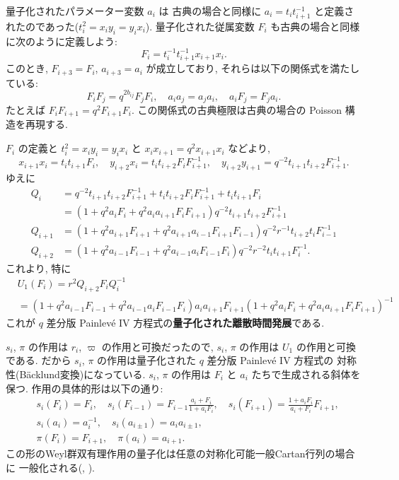 \documentclass[12pt,twoside,dvipdfm]{msjproc}
\theoremstyle{definition} %
\theoremstyle{definition} %
\theoremstyle{definition} %
\numberwithin{theorem}{section}
\numberwithin{equation}{section}
\numberwithin{figure}{section}
\numberwithin{table}{section}
\begin{document}
量子化されたパラメーター変数 $a_i$ は
古典の場合と同様に $a_i=t_i t_{i+1}^{-1}$ と定義されたのであった($t_i^2=x_i y_i=y_i x_i$).
量子化された従属変数 $F_i$ も古典の場合と同様に次のように定義しよう:
\begin{equation*}
  F_i = t_i^{-1} t_{i+1}^{-1} x_{i+1} x_i.
\end{equation*}
このとき, $F_{i+3}=F_i$, $a_{i+3}=a_i$ が成立しており, 
それらは以下の関係式を満たしている:
\begin{equation*}
  F_i F_j = q^{2 b_{ij}} F_j F_i,  \quad
 a_i a_j = a_j a_i, \quad 
 a_i F_j = F_j a_i.
\end{equation*}
たとえば $F_i F_{i+1}=q^2 F_{i+1} F_i$.
この関係式の古典極限は古典の場合の Poisson 構造を再現する.


$F_i$ の定義と $t_i^2= x_i y_i = y_i x_i$ と $x_i x_{i+1}=q^2 x_{i+1}x_i$ などより,
\begin{equation*}
  x_{i+1} x_i = t_i t_{i+1} F_i, \quad
  y_{i+2} x_i = t_i t_{i+2} F_i F_{i+1}^{-1} ,\quad
  y_{i+2} y_{i+1} = q^{-2} t_{i+1} t_{i+2} F_{i+1}^{-1}.
\end{equation*}	
ゆえに
\begin{align*}
  Q_i 
  & = q^{-2} t_{i+1} t_{i+2} F_{i+1}^{-1}
  + t_i t_{i+2} F_i F_{i+1}^{-1}
  + t_i t_{i+1} F_i
  \\
  & = ( 1 + q^2 a_i F_i + q^2 a_i a_{i+1} F_i F_{i+1} ) 
      q^{-2}t_{i+1}t_{i+2}F_{i+1}^{-1}
  \\
  Q_{i+1}
  & = ( 1 + q^2 a_{i+1} F_{i+1} + q^2 a_{i+1} a_{i-1} F_{i+1} F_{i-1} )
      q^{-2}r^{-1}t_{i+2}t_iF_{i-1}^{-1}
  \\
  Q_{i+2}
  & = (1 + q^2 a_{i-1}F_{i-1} + q^2 a_{i-1} a_i F_{i-1} F_i)
      q^{-2}r^{-2}t_it_{i+1}F_i^{-1}.
\end{align*}
これより, 特に
\begin{align*}
 &
 U_1(F_i)
 = r^2 Q_{i+2} F_i Q_i^{-1}
 \\
 &= (1 + q^2 a_{i-1}F_{i-1} + q^2 a_{i-1} a_i F_{i-1} F_i)
    a_i a_{i+1} F_{i+1}
    (1 + q^2 a_i F_i + q^2 a_i a_{i+1} F_i F_{i+1})^{-1}
\end{align*}
これが $q$ 差分版 Painlev\'e IV 方程式の{\bf 量子化された離散時間発展}である.

$s_i$, $\pi$ の作用は $r_i$, $\varpi$ の作用と可換だったので, 
$s_i$, $\pi$ の作用は $U_1$ の作用と可換である.
だから $s_i$, $\pi$ の作用は量子化された $q$ 差分版 Painlev\'e IV 方程式の
対称性(B\"acklund変換)になっている.
$s_i$, $\pi$ の作用は $F_i$ と $a_i$ たちで生成される斜体を保つ.
作用の具体的形は以下の通り:
\begin{align*}
 &
 s_i(F_i)=F_i, \quad
 s_i(F_{i-1})=F_{i-1}\frac{a_i+F_i}{1+a_i F_i}, \quad
 s_i(F_{i+1})=\frac{1+a_i F_i}{a_i+F_i}F_{i+1}, 
 \\ &
 s_i(a_i) = a_i^{-1}, \quad
 s_i(a_{i\pm1}) = a_ia_{i\pm1},
 \\ &
 \pi(F_i)=F_{i+1}, \quad \pi(a_i)=a_{i+1}.
\end{align*}
この形のWeyl群双有理作用の量子化は任意の対称化可能一般Cartan行列の場合に
一般化される(\cite{Hasegawa-QB}, \cite{Kuroki-W}).
\end{document}
